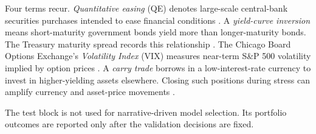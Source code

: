 Four terms recur. \emph{Quantitative easing} (QE) denotes large-scale central-bank securities purchases intended to ease financial conditions \cite{FedAssetPurchasesSeptember2012}. A \emph{yield-curve inversion} means short-maturity government bonds yield more than longer-maturity bonds. The Treasury maturity spread records this relationship \cite{FREDTreasurySpread}. The Chicago Board Options Exchange's \emph{Volatility Index} (VIX) measures near-term S\&P 500 volatility implied by option prices \cite{BISVolatility2018}. A \emph{carry trade} borrows in a low-interest-rate currency to invest in higher-yielding assets elsewhere. Closing such positions during stress can amplify currency and asset-price movements \cite{BISCarryTrades2024}.

The test block is not used for narrative-driven model selection. Its portfolio outcomes are reported only after the validation decisions are fixed.

